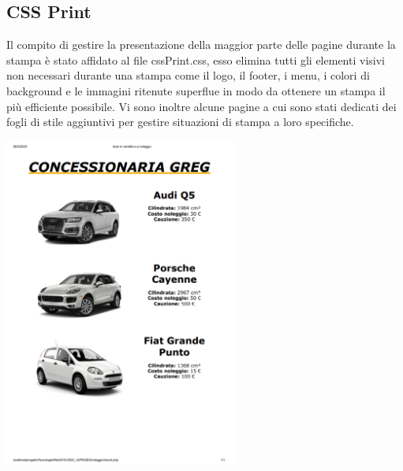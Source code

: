     \subsection{CSS Print}
        Il compito di gestire la presentazione della maggior parte delle pagine durante la stampa è stato affidato al file cssPrint.css, esso elimina tutti gli elementi visivi non necessari durante una stampa come il logo, il footer, i menu, i colori di background e le immagini ritenute superflue in modo da ottenere un stampa il più efficiente possibile.
        Vi sono inoltre alcune pagine a cui sono stati dedicati dei fogli di stile aggiuntivi per gestire situazioni di stampa a loro specifiche.

    \begin{center}
        \includegraphics[width=18pc]{./img/StampaVeicoliNoleggio.png}
    \end{center}

\pagebreak